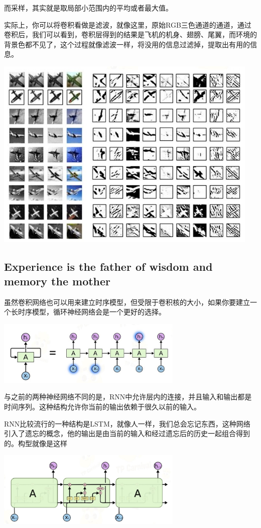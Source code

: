 \documentclass{article}
\begin{document}
而采样，其实就是取局部小范围内的平均或者最大值。

实际上，你可以将卷积看做是滤波，就像这里，原始RGB三色通道的通道，通过卷积后，我们可以看到，卷积层得到的结果是飞机的机身、翅膀、尾翼，而环境的背景色都不见了，这个过程就像滤波一样，将没用的信息过滤掉，提取出有用的信息。

\begin{center}
\includegraphics[width=5in]{image/image026.jpg}
\end{center}

\subsection{Experience is the father of wisdom and memory the mother}
虽然卷积网络也可以用来建立时序模型，但受限于卷积核的大小，如果你要建立一个长时序模型，循环神经网络会是一个更好的选择。

\begin{center}
\includegraphics[width=3.5in]{image/image028.jpg}
\end{center}

与之前的两种神经网络不同的是，RNN中允许层内的连接，并且输入和输出都是时间序列。这种结构允许你当前的输出依赖于很久以前的输入。

RNN比较流行的一种结构是LSTM，就像人一样，我们总会忘记东西，这种网络引入了遗忘的概念，他的输出是由当前的输入和经过遗忘后的历史一起组合得到的。构型就像是这样
\begin{center}
\includegraphics[width=3.5in]{image/image029.jpg}
\end{center}
\end{document}
